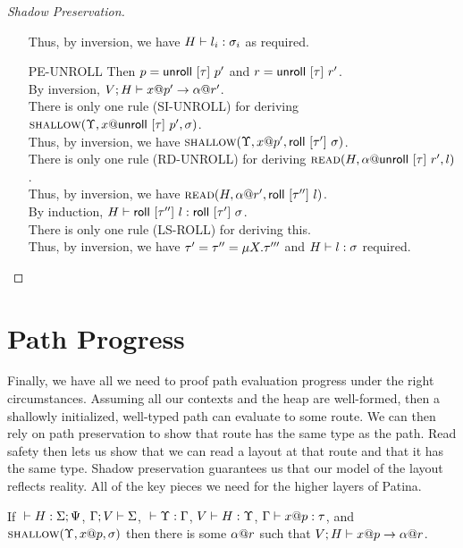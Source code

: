 \begin{proof}[Shadow Preservation]
\begin{itemize}
      Thus, by inversion, we have ${H} \vdash {l_i} : {\sigma_i}$ as required.
    \item[\textsc{PE-UNROLL}] 
      Then $p = \mathsf{unroll}~[{\tau}]~{p'}$ and $r = \mathsf{unroll}~[{\tau}]~{r'}$.\\
      By inversion, ${V;H} \vdash {{x}@{p'}} \to {{\alpha}@{r'}}$.\\
      There is only one rule (\textsc{SI-UNROLL}) for
      deriving $\textsc{shallow}({\Upsilon},{{x}@{\mathsf{unroll}~[{\tau}]~{p'}}},{\sigma})$.\\
      Thus, by inversion, we have $\textsc{shallow}({\Upsilon},{{x}@{p'}},{\mathsf{roll}~[{\tau'}]~{\sigma}})$.\\
      There is only one rule (\textsc{RD-UNROLL}) for
      deriving $\textsc{read}({H},{{\alpha}@{\mathsf{unroll}~[{\tau}]~{r'}}},{l})$.\\
      Thus, by inversion, we have $\textsc{read}({H},{{\alpha}@{r'}},{\mathsf{roll}~[{\tau''}]~{l}})$.\\
      By induction, ${H} \vdash {\mathsf{roll}~[{\tau''}]~{l}} : {\mathsf{roll}~[{\tau'}]~{\sigma}}$.\\
      There is only one rule (\textsc{LS-ROLL}) for deriving this.\\
      Thus, by inversion, we have $\tau' = \tau'' = \mu {X}.{\tau'''}$
      and ${H} \vdash {l} : {\sigma}$ required.
  \end{itemize}
\end{proof}

\section*{Path Progress}
Finally, we have all we need to proof path evaluation progress under the right circumstances.
Assuming all our contexts and the heap are well-formed,
then a shallowly initialized, well-typed path can evaluate to some route.
We can then rely on path preservation to show that route has the same type as the path.
Read safety then lets us show that we can read a layout at that route
and that it has the same type. Shadow preservation guarantees us that our
model of the layout reflects reality. All of the key pieces we need for
the higher layers of Patina.

\begin{lem}
  \raggedright{}
  If ${} \vdash {H} : {\Sigma;\Psi}$, $\Gamma;V\vdash\Sigma$, ${} \vdash {\Upsilon} : {\Gamma}$, ${V} \vdash {H} : {\Upsilon}$,
  ${\Gamma} \vdash {{x}@{p}} : {\tau}$, and $\textsc{shallow}({\Upsilon},{{x}@{p}},{\sigma})$
  then there is some ${\alpha}@{r}$ such that ${V;H} \vdash {{x}@{p}} \to {{\alpha}@{r}}$.
\end{lem}

